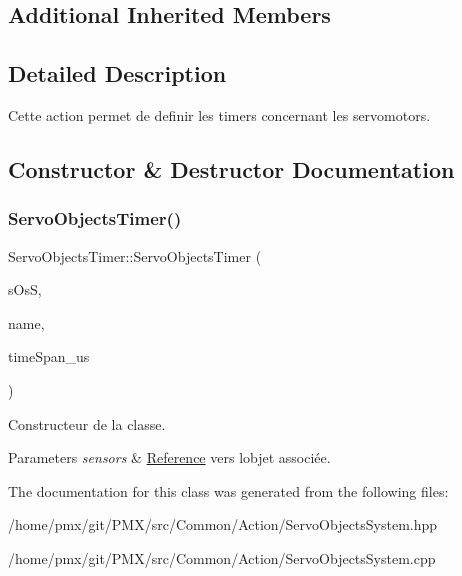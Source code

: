 \subsection*{Additional Inherited Members}


\subsection{Detailed Description}
Cette action permet de definir les timers concernant les servomotors. 

\subsection{Constructor \& Destructor Documentation}
\mbox{\label{classServoObjectsTimer_a63cc29effd9e265d70097c1eed5ca9a9}} 
\subsubsection{\texorpdfstring{Servo\+Objects\+Timer()}{ServoObjectsTimer()}}
{\footnotesize\ttfamily Servo\+Objects\+Timer\+::\+Servo\+Objects\+Timer (\begin{DoxyParamCaption}\item[{\hyperlink{classServoObjectsSystem}{Servo\+Objects\+System} \&}]{s\+OsS,  }\item[{std\+::string}]{name,  }\item[{uint}]{time\+Span\+\_\+us }\end{DoxyParamCaption})}



Constructeur de la classe. 


\begin{DoxyParams}{Parameters}
{\em sensors} & \hyperlink{structReference}{Reference} vers l\textquotesingle{}objet associée. \\
\hline
\end{DoxyParams}


The documentation for this class was generated from the following files\+:\begin{DoxyCompactItemize}
\item 
/home/pmx/git/\+P\+M\+X/src/\+Common/\+Action/Servo\+Objects\+System.\+hpp\item 
/home/pmx/git/\+P\+M\+X/src/\+Common/\+Action/Servo\+Objects\+System.\+cpp\end{DoxyCompactItemize}
